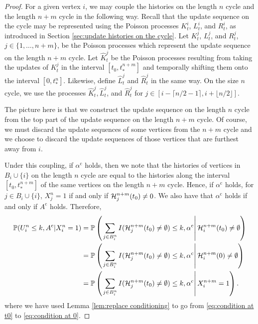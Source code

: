 \begin{proof}
		For a given vertex $i$, we may couple the histories on the length $n$ cycle and the length $n+m$ cycle in the following way. Recall that the update sequence on the cycle may be represented using the Poisson processes $K_t^i$, $L_t^i$, and $R_t^i$, as introduced in Section \ref{sec:update histories on the cycle}. Let $K_t^j$, $L_t^j$, and $R_t^j$, $j \in \{1,\dots, n+m\}$, be the Poisson processes which represent the update sequence on the length $n+m$ cycle. Let $\hat{K}_t^j$ be the Poisson processes resulting from taking the updates of $K_t^j$ in the interval $[t_0, t_*^{n+m}]$ and temporally shifting them onto the interval $[0, t_*^n]$. Likewise, define $\hat{L}_t^j$ and $\hat{R}_t^j$ in the same way. On the size $n$ cycle, we use the processes $\hat{K}_t^j, \hat{L}_t^j$, and $\hat{R}_t^j$ for $j \in [i- \lceil n/2 - 1 \rceil, i + \lfloor n/2\rfloor]$. 

		The picture here is that we construct the update sequence on the length $n$ cycle from the top part of the update sequence on the length $n+m$ cycle. Of course, we must discard the update sequences of some vertices from the $n+m$ cycle and we choose to discard the update sequences of those vertices that are furthest away from $i$.

		Under this coupling, if $\alpha^\mathrm{c}$ holds, then we note that the histories of vertices in $B_i \cup \{i\}$ on the length $n$ cycle are equal to the histories along the interval $[t_0, t_*^{n+m}]$ of the same vertices on the length $n+m$ cycle. Hence, if $\alpha^\mathrm{c}$ holds, for $j \in B_i \cup \{i\}$, $X_j^n = 1$ if and only if $\mathcal{H}_j^{n+m}(t_0) \neq 0$. We also have that $\alpha^\mathrm{c}$ holds if and only if $A^\mathrm{c}$ holds. Therefore,
		\begin{align}
			\mathbb{P}(U_i^n \leq k, A^\mathrm{c} | X_i^n = 1) &= \mathbb{P}\left(\left.\sum_{j \in B_i^n} I(\mathcal{H}_j^{n+m}(t_0) \neq \emptyset) \leq k, \alpha^\mathrm{c} \right| \mathcal{H}_i^{n+m}(t_0) \neq \emptyset \right) \label{eq:condition at t0}\\
			&= \mathbb{P}\left(\left.\sum_{j \in B_i^n} I(\mathcal{H}_j^{n+m}(t_0) \neq \emptyset) \leq k, \alpha^\mathrm{c} \right| \mathcal{H}_i^{n+m}(0) \neq \emptyset \right) \label{eq:condition at 0}\\
			&= \mathbb{P}\left(\left.\sum_{j \in B_i^n} I(\mathcal{H}_j^{n+m}(t_0) \neq \emptyset) \leq k, \alpha^\mathrm{c} \right| X_i^{n+m} = 1 \right).
		\end{align}
		where we have used Lemma \ref{lem:replace conditioning} to go from \eqref{eq:condition at t0} to \eqref{eq:condition at 0}.


\end{proof}
